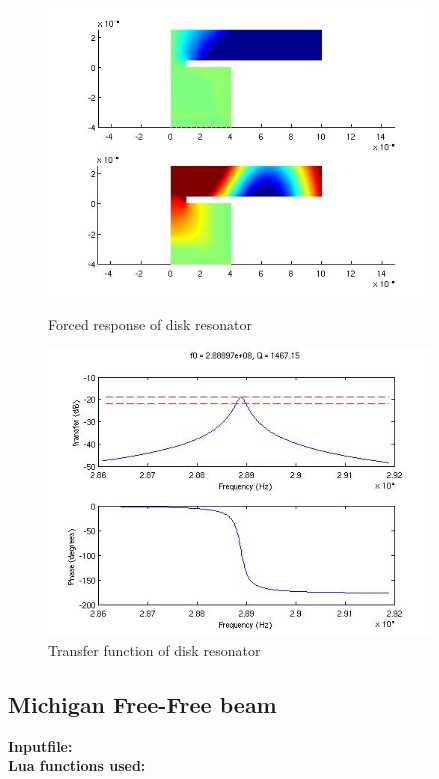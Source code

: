 \begin{figure}[htbp]
\centering
\includegraphics[height = 3in]{fig/disk_resonator_forced.jpg}
\caption{Forced response of disk resonator}
\label{fig:DiskResonatorForced}
\includegraphics[height = 3in]{fig/disk_resonator_transfer.jpg}
\caption{Transfer function  of disk resonator}
\label{fig:DiskResonatorTransfer}
\end{figure}

\clearpage
\subsection{Michigan Free-Free beam}
\begin{flushleft}
  \textbf{Inputfile:}
  \\
  \textbf{Lua functions used:}
\end{flushleft}

